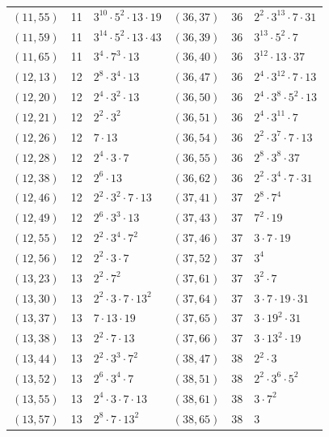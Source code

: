\documentclass[11pt]{article}
\begin{document}
\begin{longtable}{@{}lrl@{\qquad}lrl@{}}
$(11,55)$ & 11 & $3^{10}\cdot 5^{2}\cdot 13\cdot 19$ & $(36,37)$ & 36 & $2^{2}\cdot 3^{13}\cdot 7\cdot 31$\\
$(11,59)$ & 11 & $3^{14}\cdot 5^{2}\cdot 13\cdot 43$ & $(36,39)$ & 36 & $3^{13}\cdot 5^{2}\cdot 7$\\
$(11,65)$ & 11 & $3^{4}\cdot 7^{3}\cdot 13$ & $(36,40)$ & 36 & $3^{12}\cdot 13\cdot 37$\\
$(12,13)$ & 12 & $2^{8}\cdot 3^{4}\cdot 13$ & $(36,47)$ & 36 & $2^{4}\cdot 3^{12}\cdot 7\cdot 13$\\
$(12,20)$ & 12 & $2^{4}\cdot 3^{2}\cdot 13$ & $(36,50)$ & 36 & $2^{4}\cdot 3^{8}\cdot 5^{2}\cdot 13$\\
$(12,21)$ & 12 & $2^{2}\cdot 3^{2}$ & $(36,51)$ & 36 & $2^{4}\cdot 3^{11}\cdot 7$\\
$(12,26)$ & 12 & $7\cdot 13$ & $(36,54)$ & 36 & $2^{2}\cdot 3^{7}\cdot 7\cdot 13$\\
$(12,28)$ & 12 & $2^{4}\cdot 3\cdot 7$ & $(36,55)$ & 36 & $2^{8}\cdot 3^{8}\cdot 37$\\
$(12,38)$ & 12 & $2^{6}\cdot 13$ & $(36,62)$ & 36 & $2^{2}\cdot 3^{4}\cdot 7\cdot 31$\\
$(12,46)$ & 12 & $2^{2}\cdot 3^{2}\cdot 7\cdot 13$ & $(37,41)$ & 37 & $2^{8}\cdot 7^{4}$\\
$(12,49)$ & 12 & $2^{6}\cdot 3^{3}\cdot 13$ & $(37,43)$ & 37 & $7^{2}\cdot 19$\\
$(12,55)$ & 12 & $2^{2}\cdot 3^{4}\cdot 7^{2}$ & $(37,46)$ & 37 & $3\cdot 7\cdot 19$\\
$(12,56)$ & 12 & $2^{2}\cdot 3\cdot 7$ & $(37,52)$ & 37 & $3^{4}$\\
$(13,23)$ & 13 & $2^{2}\cdot 7^{2}$ & $(37,61)$ & 37 & $3^{2}\cdot 7$\\
$(13,30)$ & 13 & $2^{2}\cdot 3\cdot 7\cdot 13^{2}$ & $(37,64)$ & 37 & $3\cdot 7\cdot 19\cdot 31$\\
$(13,37)$ & 13 & $7\cdot 13\cdot 19$ & $(37,65)$ & 37 & $3\cdot 19^{2}\cdot 31$\\
$(13,38)$ & 13 & $2^{2}\cdot 7\cdot 13$ & $(37,66)$ & 37 & $3\cdot 13^{2}\cdot 19$\\
$(13,44)$ & 13 & $2^{2}\cdot 3^{3}\cdot 7^{2}$ & $(38,47)$ & 38 & $2^{2}\cdot 3$\\
$(13,52)$ & 13 & $2^{6}\cdot 3^{4}\cdot 7$ & $(38,51)$ & 38 & $2^{2}\cdot 3^{6}\cdot 5^{2}$\\
$(13,55)$ & 13 & $2^{4}\cdot 3\cdot 7\cdot 13$ & $(38,61)$ & 38 & $3\cdot 7^{2}$\\
$(13,57)$ & 13 & $2^{8}\cdot 7\cdot 13^{2}$ & $(38,65)$ & 38 & $3$\\

\end{longtable}
\end{document}
